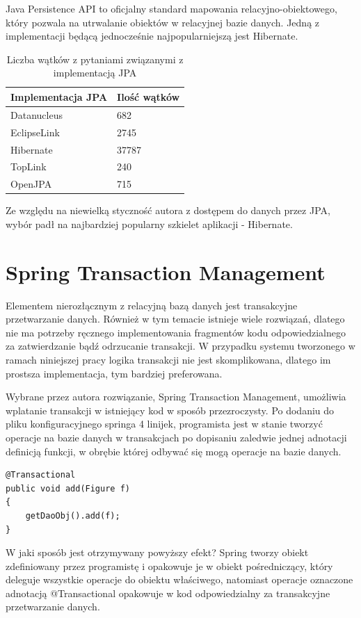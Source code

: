 Java Persistence API to oficjalny standard mapowania relacyjno-obiektowego, który pozwala na utrwalanie obiektów w relacyjnej bazie danych. Jedną z implementacji będącą jednocześnie najpopularniejszą jest Hibernate.

\begin{table}[H]
\caption{Liczba wątków z pytaniami związanymi z implementacją JPA}
\label{jpaImplementations}
\begin{center}
\begin{tabular}{|l|l|}
\multicolumn{1}{c}{Implementacja JPA} & \multicolumn{1}{c}{Ilość wątków} \\ \hline
Datanucleus & 682 \\ \hline
EclipseLink & 2745 \\ \hline
Hibernate & 37787 \\ \hline
TopLink & 240 \\ \hline
OpenJPA & 715 \\ \hline
\end{tabular} 
\end{center}
\end{table} 

Ze względu na niewielką styczność autora z dostępem do danych przez JPA, wybór padł na najbardziej popularny szkielet aplikacji - Hibernate.

\section{Spring Transaction Management}
Elementem nierozłącznym z relacyjną bazą danych jest transakcyjne przetwarzanie danych. Również w tym temacie istnieje wiele rozwiązań, dlatego nie ma potrzeby ręcznego implementowania fragmentów kodu odpowiedzialnego za zatwierdzanie bądź odrzucanie transakcji. W przypadku systemu tworzonego w ramach niniejszej pracy logika transakcji nie jest skomplikowana, dlatego im prostsza implementacja, tym bardziej preferowana.

Wybrane przez autora rozwiązanie, Spring Transaction Management, umożliwia wplatanie transakcji w istniejący kod w sposób przezroczysty. Po dodaniu do pliku konfiguracyjnego springa 4 linijek, programista jest w stanie tworzyć operacje na bazie danych w transakcjach po dopisaniu zaledwie jednej adnotacji definicją funkcji, w obrębie której odbywać się mogą operacje na bazie danych.

\begin{lstlisting}
@Transactional
public void add(Figure f)
{
	getDaoObj().add(f);
}
\end{lstlisting}
\newpage
W jaki sposób jest otrzymywany powyższy efekt? Spring tworzy obiekt zdefiniowany przez programistę i opakowuje je w obiekt pośredniczący, który deleguje wszystkie operacje do obiektu właściwego, natomiast operacje oznaczone adnotacją @Transactional opakowuje w kod odpowiedzialny za transakcyjne przetwarzanie danych.

